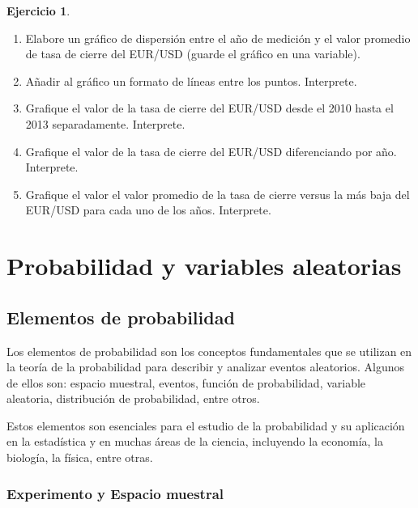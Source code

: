\documentclass[
]{book}
\providecommand{\tightlist}{%
  \setlength{\itemsep}{0pt}\setlength{\parskip}{0pt}}
\theoremstyle{definition}
\theoremstyle{definition}
\theoremstyle{definition}
\newtheorem{exercise}{Ejercicio}[chapter]
\theoremstyle{definition}
\theoremstyle{remark}
\begin{document}
\begin{exercise}
\leavevmode

\begin{enumerate}
\def\labelenumi{\arabic{enumi}.}
\tightlist
\item
  Elabore un gráfico de dispersión entre el año de medición y el valor promedio de tasa de cierre del EUR/USD (guarde el gráfico en una variable).
\item
  Añadir al gráfico un formato de líneas entre los puntos. Interprete.
\item
  Grafique el valor de la tasa de cierre del EUR/USD desde el 2010 hasta el 2013 separadamente. Interprete.
\item
  Grafique el valor de la tasa de cierre del EUR/USD diferenciando por año. Interprete.
\item
  Grafique el valor el valor promedio de la tasa de cierre versus la más baja del EUR/USD para cada uno de los años. Interprete.
\end{enumerate}

\end{exercise}

\hypertarget{probabilidad-y-variables-aleatorias}{%
\chapter{Probabilidad y variables aleatorias}\label{probabilidad-y-variables-aleatorias}}

\hypertarget{elementos-de-probabilidad}{%
\section{Elementos de probabilidad}\label{elementos-de-probabilidad}}

Los elementos de probabilidad son los conceptos fundamentales que se utilizan en la teoría de la probabilidad para describir y analizar eventos aleatorios. Algunos de ellos son: espacio muestral, eventos, función de probabilidad, variable aleatoria, distribución de probabilidad, entre otros.

Estos elementos son esenciales para el estudio de la probabilidad y su aplicación en la estadística y en muchas áreas de la ciencia, incluyendo la economía, la biología, la física, entre otras.

\hypertarget{experimento-y-espacio-muestral}{%
\subsection{Experimento y Espacio muestral}\label{experimento-y-espacio-muestral}}
\end{document}
